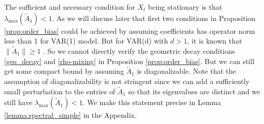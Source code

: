 The sufficient and necessary condition for $X_t$ being stationary is that $\lambda_{\text{max}}( \tilde{A}_1)<1$. As we will discuss later that first two conditions in Proposition \ref{prop:order_bias} could be achieved by assuming coefficients has operator norm less than 1 for VAR(1) model.  But for VAR(d) with $d > 1$, it is known that $\|\tilde{A}_1\| \ge 1$ \citep{Basu2015}. So we cannot directly verify the geometric decay conditions \ref{geo_decay} and \ref{rho-mixing} in Proposition \ref{prop:order_bias}. But we can still get some compact bound by assuming $\tilde{A}_1$ is diagonalizable. Note that the assumption of diagonalizability is not stringent since  we can add a sufficiently small perturbation to the entries of $\tilde{A}_1$  so that its eigenvalues are distinct and we still have  $\lambda_{\text{max}}( \tilde{A}_1)<1$. We make this statement precise in Lemma \ref{lemma:spectral_simple} in the Appendix. 

